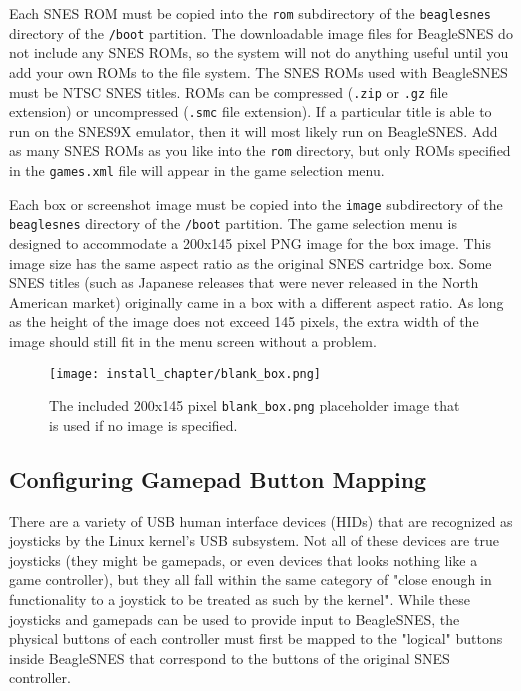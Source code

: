 Each SNES ROM must be copied into the \texttt{rom} subdirectory of the \texttt{beaglesnes} directory of the \texttt{/boot} partition.  The downloadable image files for BeagleSNES do not include any SNES ROMs, so the system will not do anything useful until you add your own ROMs to the file system.  The SNES ROMs used with BeagleSNES must be NTSC SNES titles. ROMs can be compressed (\texttt{.zip} or \texttt{.gz} file extension) or uncompressed (\texttt{.smc} file extension).  If a particular title is able to run on the SNES9X emulator, then it will most likely run on BeagleSNES.  Add as many SNES ROMs as you like into the \texttt{rom} directory, but only ROMs specified in the \texttt{games.xml} file will appear in the game selection menu.

Each box or screenshot image must be copied into the \texttt{image} subdirectory of the \texttt{beaglesnes} directory of the \texttt{/boot} partition. The game selection menu is designed to accommodate a 200x145 pixel PNG image for the box image. This image size has the same aspect ratio as the original SNES cartridge box.  Some SNES titles (such as Japanese releases that were never released in the North American market) originally came in a box with a different aspect ratio. As long as the height of the image does not exceed 145 pixels, the extra width of the image should still fit in the menu screen without a problem.

\begin{figure}[h]
\centering\texttt{[image: install\_chapter/blank\_box.png]}
\caption{The included 200x145 pixel \texttt{blank\_box.png} placeholder image that is used if no image is specified.}
\end{figure}

\subsection{Configuring Gamepad Button Mapping}\label{sec:conf_gamepad}

There are a variety of USB human interface devices (HIDs) that are recognized as joysticks by the Linux kernel's USB subsystem.  Not all of these devices are true joysticks (they might be gamepads, or even devices that looks nothing like a game controller), but they all fall within the same category of "close enough in functionality to a joystick to be treated as such by the kernel".  While  these joysticks and gamepads can be used to provide input to BeagleSNES, the physical buttons of each controller must first be mapped to the "logical" buttons inside BeagleSNES that correspond to the buttons of the original SNES controller.  

